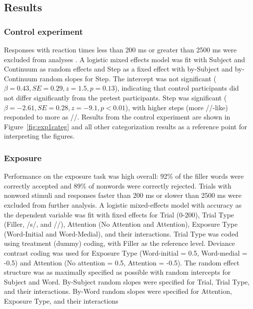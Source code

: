 \subsection{Results}

\subsubsection{Control experiment}

Responses with reaction times less than 200 ms or greater than 2500 ms were excluded from analyses \citep[following][]{Reinisch2013}. 
A logistic mixed effects model was fit with Subject and Continuum as random effects and Step as a fixed effect with by-Subject and by-Continuum random slopes for Step. 
The intercept was not significant ($\beta = 0.43, SE = 0.29, z = 1.5, p = 0.13$), indicating that control participants did not differ significantly from the pretest participants.
Step was significant ($\beta = -2.61, SE = 0.28, z = -9.1, p < 0.01$), with higher steps (more /\textesh/-like) responded to more as /\textesh/.
Results from the control experiment are shown in Figure~\ref{fig:exp1categ} and all other categorization results as a reference point for interpreting the figures.

\subsubsection{Exposure}

Performance on the exposure task was high overall: 92\% of the filler words were correctly accepted and 89\% of nonwords were correctly rejected.  
Trials with nonword stimuli and responses faster than 200 ms or slower than 2500 ms were excluded from further analysis. 
A logistic mixed-effects model with accuracy as the dependent variable was fit with fixed effects for Trial (0-200), Trial Type (Filler, /s/, and /\textesh/), Attention (No Attention and Attention), Exposure Type (Word-Initial and Word-Medial), and their interactions.   
Trial Type was coded using treatment (dummy) coding, with Filler as the reference level.  
Deviance contrast coding was used for Exposure Type (Word-initial = 0.5, Word-medial = -0.5) and Attention (No attention = 0.5, Attention = -0.5).
The random effect structure was as maximally specified as possible with random intercepts for Subject and Word.
By-Subject random slopes were specified for Trial, Trial Type, and their interactions.
By-Word random slopes were specified for Attention, Exposure Type, and their interactions


